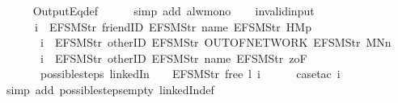 \begin{isabellebody}
\ \ \ \ \isamarkupfalse%
\ OutputEq{\isacharunderscore}def\isanewline
\ \ \ \ \isamarkupfalse%
\ {\isacharparenleft}simp\ add{\isacharcolon}\ alw{\isacharunderscore}mono{\isacharparenright}\isanewline
\ \ \isamarkupfalse%
\isanewline
{}\isamarkupfalse%
%
\endisatagproof
{\isafoldproof}%
%
\isadelimproof
\isanewline
%
\endisadelimproof
\isanewline
{}\isamarkupfalse%
\ invalid{\isacharunderscore}input{\isacharunderscore}{}{\isacharcolon}\isanewline
\ \ \ \ \ \ {\isachardoublequoteopen}i\ {\isasymnoteq}\ {\isacharbrackleft}EFSM{\isachardot}Str\ {\isacharprime}{\isacharprime}friendID{\isacharprime}{\isacharprime}{\isacharcomma}\ EFSM{\isachardot}Str\ {\isacharprime}{\isacharprime}name{\isacharprime}{\isacharprime}{\isacharcomma}\ EFSM{\isachardot}Str\ {\isacharprime}{\isacharprime}HM{}p{\isacharprime}{\isacharprime}{\isacharbrackright}\ {\isasymLongrightarrow}\isanewline
\ \ \ \ \ \ \ i\ {\isasymnoteq}\ {\isacharbrackleft}EFSM{\isachardot}Str\ {\isacharprime}{\isacharprime}otherID{\isacharprime}{\isacharprime}{\isacharcomma}\ EFSM{\isachardot}Str\ {\isacharprime}{\isacharprime}OUT{\isacharunderscore}OF{\isacharunderscore}NETWORK{\isacharprime}{\isacharprime}{\isacharcomma}\ EFSM{\isachardot}Str\ {\isacharprime}{\isacharprime}MNn{}{\isacharprime}{\isacharprime}{\isacharbrackright}\ {\isasymLongrightarrow}\isanewline
\ \ \ \ \ \ \ i\ {\isasymnoteq}\ {\isacharbrackleft}EFSM{\isachardot}Str\ {\isacharprime}{\isacharprime}otherID{\isacharprime}{\isacharprime}{\isacharcomma}\ EFSM{\isachardot}Str\ {\isacharprime}{\isacharprime}name{\isacharprime}{\isacharprime}{\isacharcomma}\ EFSM{\isachardot}Str\ {\isacharprime}{\isacharprime}{}zoF{\isacharprime}{\isacharprime}{\isacharbrackright}\ {\isasymLongrightarrow}\isanewline
\ \ \ \ \ \ \ possible{\isacharunderscore}steps\ linkedIn\ {}\ {\isacharparenleft}{\isacharless}{\isachargreater}{\isacharparenleft}{}\ {\isacharcolon}{\isacharequal}\ EFSM{\isachardot}Str\ {\isacharprime}{\isacharprime}free{\isacharprime}{\isacharprime}{\isacharparenright}{\isacharparenright}\ l\ i\ {\isacharequal}\ {\isacharbraceleft}{\isacharbar}{\isacharbar}{\isacharbraceright}{\isachardoublequoteclose}\isanewline
%
\isadelimproof
\ \ %
\endisadelimproof
%
\isatagproof
{}\isamarkupfalse%
\ {\isacharparenleft}case{\isacharunderscore}tac\ i{\isacharparenright}\isanewline
\ \ \ \isamarkupfalse%
\ {\isacharparenleft}simp\ add{\isacharcolon}\ possible{\isacharunderscore}steps{\isacharunderscore}empty\ linkedIn{\isacharunderscore}def{\isacharparenright}\isanewline

\end{isabellebody}
